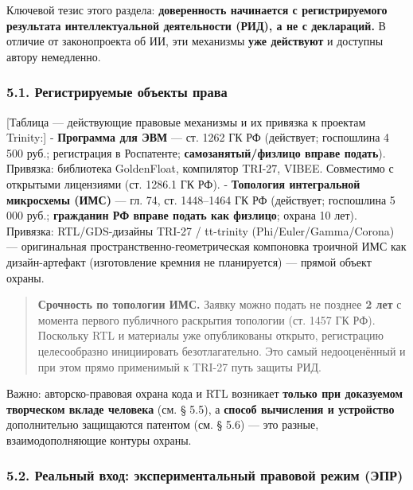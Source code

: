 \documentclass[
  russian,
]{article}
\begin{document}
Ключевой тезис этого раздела: \textbf{доверенность начинается с
регистрируемого результата интеллектуальной деятельности (РИД), а не с
деклараций.} В отличие от законопроекта об ИИ, эти механизмы \textbf{уже
действуют} и доступны автору немедленно.

\subsubsection{5.1. Регистрируемые объекты
права}\label{ux440ux435ux433ux438ux441ux442ux440ux438ux440ux443ux435ux43cux44bux435-ux43eux431ux44aux435ux43aux442ux44b-ux43fux440ux430ux432ux430}

{[}Таблица --- действующие правовые механизмы и их привязка к проектам
Trinity:{]} - \textbf{Программа для ЭВМ} --- ст. 1262 ГК РФ (действует;
госпошлина 4 500 руб.; регистрация в Роспатенте;
\textbf{самозанятый/физлицо вправе подать}). Привязка: библиотека
GoldenFloat, компилятор TRI-27, VIBEE. Совместимо с открытыми лицензиями
(ст. 1286.1 ГК РФ). - \textbf{Топология интегральной микросхемы (ИМС)}
--- гл. 74, ст. 1448--1464 ГК РФ (действует; госпошлина 5 000 руб.;
\textbf{гражданин РФ вправе подать как физлицо}; охрана 10 лет).
Привязка: RTL/GDS-дизайны TRI-27 / tt-trinity (Phi/Euler/Gamma/Corona) ---
оригинальная пространственно-геометрическая компоновка троичной ИМС как
дизайн-артефакт (изготовление кремния не планируется) ---
прямой объект охраны.

\begin{quote}
\textbf{Срочность по топологии ИМС.} Заявку можно подать не позднее
\textbf{2 лет} с момента первого публичного раскрытия топологии (ст.
1457 ГК РФ). Поскольку RTL и материалы уже опубликованы открыто,
регистрацию целесообразно инициировать безотлагательно. Это самый
недооценённый и при этом прямо применимый к TRI-27 путь защиты РИД.
\end{quote}

Важно: авторско-правовая охрана кода и RTL возникает \textbf{только при
доказуемом творческом вкладе человека} (см. § 5.5), а \textbf{способ
вычисления и устройство} дополнительно защищаются патентом (см. § 5.6)
--- это разные, взаимодополняющие контуры охраны.

\subsubsection{5.2. Реальный вход: экспериментальный правовой режим
(ЭПР)}\label{ux440ux435ux430ux43bux44cux43dux44bux439-ux432ux445ux43eux434-ux44dux43aux441ux43fux435ux440ux438ux43cux435ux43dux442ux430ux43bux44cux43dux44bux439-ux43fux440ux430ux432ux43eux432ux43eux439-ux440ux435ux436ux438ux43c-ux44dux43fux440}
\end{document}

